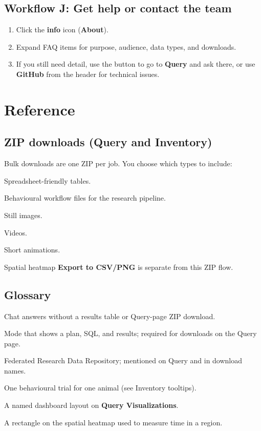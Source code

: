 \documentclass{article}
\begin{document}
\subsection{Workflow J: Get help or contact the team}
\label{wf:about}

\begin{enumerate}
  \item Click the \textbf{info} icon (\textbf{About}).
  \item Expand FAQ items for purpose, audience, data types, and downloads.
  \item If you still need detail, use the button to go to \textbf{Query} and ask there, or use \textbf{GitHub} from the header for technical issues.
\end{enumerate}

\section{Reference}
\label{sec:reference}

\subsection{ZIP downloads (Query and Inventory)}
\label{ref:zip}

Bulk downloads are one ZIP per job. You choose which types to include:

\begin{description}[style=nextline, font=\normalfont\bfseries]
  \item[CSV] Spreadsheet-friendly tables.
  \item[EWB] Behavioural workflow files for the research pipeline.
  \item[JPG] Still images.
  \item[MPG] Videos.
  \item[GIF] Short animations.
\end{description}

Spatial heatmap \textbf{Export to CSV/PNG} is separate from this ZIP flow.

\subsection{Glossary}
\label{sec:glossary}

\begin{description}[style=nextline, font=\normalfont\bfseries]
  \item[Ask] Chat answers without a results table or Query-page ZIP download.
  \item[Select] Mode that shows a plan, SQL, and results; required for downloads on the Query page.
  \item[FRDR] Federated Research Data Repository; mentioned on Query and in download names.
  \item[Session] One behavioural trial for one animal (see Inventory tooltips).
  \item[Graph set] A named dashboard layout on \textbf{Query Visualizations}.
  \item[Home base] A rectangle on the spatial heatmap used to measure time in a region.
\end{description}
\end{document}
